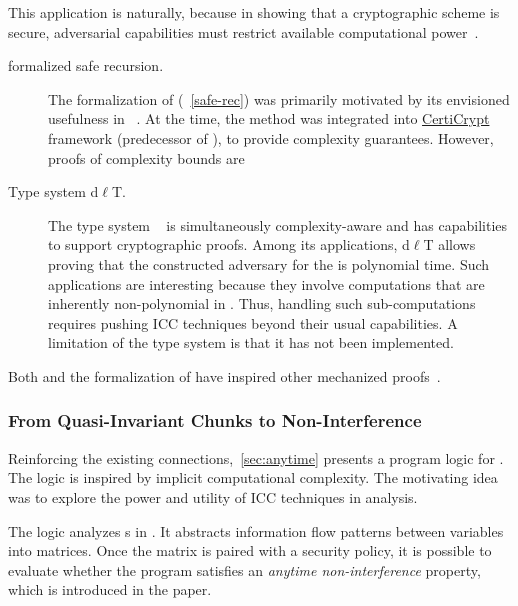 This application is naturally, because in showing that a cryptographic scheme is secure, adversarial capabilities must restrict available computational power~\cite{heraud2011}.

\begin{description}

\item[formalized safe recursion.]
The formalization of  (\cf~\autoref{safe-rec}) was primarily motivated by its envisioned usefulness in ~\cite{heraud2011}. At the time, the method was integrated into \href{https://github.com/EasyCrypt/certicrypt}{CertiCrypt} framework (predecessor of ), to provide complexity guarantees.
However, proofs of complexity bounds are

\item[Type system d\(\ell\)T.]
The type system ~\cite{baillot2015,baillot2019} is simultaneously complexity-aware and has capabilities to support cryptographic proofs.
Among its applications, d\(\ell\)T allows proving that the constructed adversary for the  is polynomial time.
Such applications are interesting because they involve computations that are inherently non-polynomial in .
Thus, handling such sub-computations requires pushing ICC techniques beyond their usual capabilities.
A limitation of the type system is that it has not been implemented.

\end{description}
Both  and the formalization of  have inspired other mechanized proofs~\cite{barbosa2021,feree2018}.

\subsubsection{From Quasi-Invariant Chunks to Non-Interference}
\label{subsubsec:quasi-ni}

Reinforcing the existing connections,~\autoref{sec:anytime} presents a program logic for .
The logic is inspired by implicit computational complexity.
The motivating idea was to explore the power and utility of ICC techniques in  analysis.

The logic analyzes s in .
It abstracts information flow patterns between variables into matrices.
Once the matrix is paired with a security policy, it is possible to evaluate whether the program satisfies an \emph{anytime non-interference} property, which is introduced in the paper.

